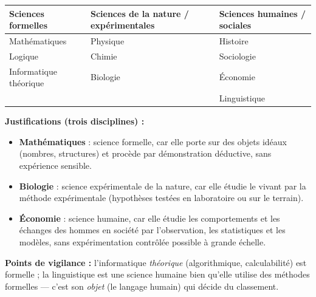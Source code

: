 \documentclass[11pt]{article}
\begin{document}
\begin{corrige}
\begin{center}
\begin{tabularx}{\linewidth}{|l|X|X|}\hline
\rowcolor{popblueL} \textbf{Sciences formelles} & \textbf{Sciences de la nature / expérimentales} & \textbf{Sciences humaines / sociales} \\ \hline
Mathématiques & Physique & Histoire \\ \hline
Logique & Chimie & Sociologie \\ \hline
Informatique théorique & Biologie & Économie \\ \hline
 & & Linguistique \\ \hline
\end{tabularx}
\end{center}
\textbf{Justifications (trois disciplines) :}
\begin{itemize}
    \item \textbf{Mathématiques} : science formelle, car elle porte sur des objets idéaux (nombres, structures) et procède par démonstration déductive, sans expérience sensible.
    \item \textbf{Biologie} : science expérimentale de la nature, car elle étudie le vivant par la méthode expérimentale (hypothèses testées en laboratoire ou sur le terrain).
    \item \textbf{Économie} : science humaine, car elle étudie les comportements et les échanges des hommes en société par l'observation, les statistiques et les modèles, sans expérimentation contrôlée possible à grande échelle.
\end{itemize}
\textbf{Points de vigilance :} l'informatique \emph{théorique} (algorithmique, calculabilité) est formelle ; la linguistique est une science humaine bien qu'elle utilise des méthodes formelles — c'est son \emph{objet} (le langage humain) qui décide du classement.
\end{corrige}
\end{document}
